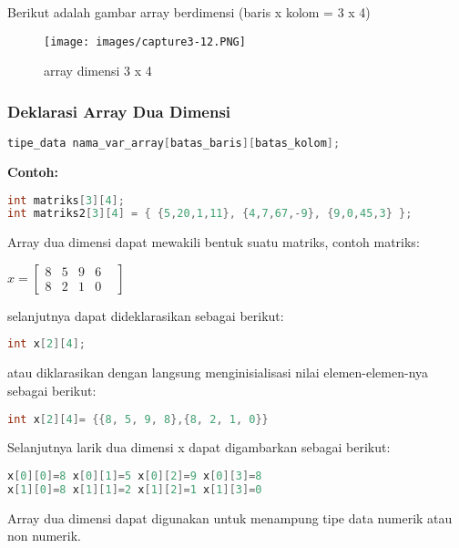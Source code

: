 Berikut adalah gambar array berdimensi (baris x kolom = 3 x 4)

\begin{figure}[htbp]
\centering
\texttt{[image: images/capture3-12.PNG]}
\label{gambar3-3}
\caption{array dimensi 3 x 4}
\end{figure}

\subsubsection{Deklarasi Array Dua
Dimensi}\label{deklarasi-array-dua-dimensi}

\begin{lstlisting}[language=c++, numbers=none]
tipe_data nama_var_array[batas_baris][batas_kolom];
\end{lstlisting}

\textbf{Contoh:}

\begin{lstlisting}[language=c++, numbers=none]
int matriks[3][4];
int matriks2[3][4] = { {5,20,1,11}, {4,7,67,-9}, {9,0,45,3} };
\end{lstlisting}

Array dua dimensi dapat mewakili bentuk suatu matriks, contoh matriks:


$x=
\begin{bmatrix}
	8 &5& 9 & 6 & \\
	8 & 2 & 1 & 0
\end{bmatrix}$

selanjutnya dapat dideklarasikan sebagai berikut:

\begin{lstlisting}[language=c++]
int x[2][4];
\end{lstlisting}

atau diklarasikan dengan langsung menginisialisasi nilai
elemen-elemen-nya sebagai berikut:

\begin{lstlisting}[language=c++, numbers=none]
int x[2][4]= {{8, 5, 9, 8},{8, 2, 1, 0}}
\end{lstlisting}

Selanjutnya larik dua dimensi x dapat digambarkan sebagai berikut:

\begin{lstlisting}[language=c++, numbers=none]
x[0][0]=8 x[0][1]=5 x[0][2]=9 x[0][3]=8
x[1][0]=8 x[1][1]=2 x[1][2]=1 x[1][3]=0
\end{lstlisting}

Array dua dimensi dapat digunakan untuk menampung tipe data numerik atau
non numerik.

